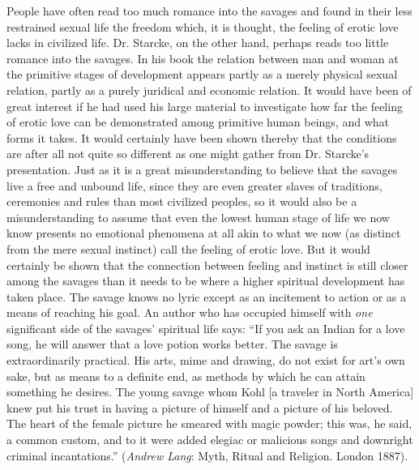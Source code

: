 \documentclass[12pt,a4paper,openany]{book}
\begin{document}
People have often read too much romance into the savages
and found in their less restrained sexual life the freedom which, it is
thought, the feeling of erotic love lacks in civilized life. Dr. Starcke,
on the other hand, perhaps reads too little romance into the savages.
In his book the relation between man and woman at
the primitive stages of development appears partly as a merely physical sexual relation,
partly as a purely juridical and economic relation. It would have
been of great interest if he had used his large material
to investigate how far the feeling of erotic love can be demonstrated among
primitive human beings, and what forms it takes. It would
certainly have been shown thereby that the conditions are after all not quite so
different as one might gather from Dr. Starcke's presentation.
Just as it is a great misunderstanding to believe that
the savages live a free and unbound life, since they are even greater
slaves of traditions, ceremonies and rules than most civilized
peoples, so it would also be a misunderstanding to
assume that even the lowest human stage of life we now know
presents no emotional phenomena at all akin to
what we now (as distinct from the mere sexual instinct) call the feeling of erotic love.
But it would certainly be shown that the connection between
feeling and instinct is still closer among the savages than it needs
to be where a higher spiritual development has taken place. The
savage knows no lyric except as an incitement to action or
as a means of reaching his goal. An author who has occupied himself
with \emph{one} significant side of the savages' spiritual life says:
``If you ask an Indian for a love song, he will answer
that a love potion works better. The savage is extraordinarily practical.
His arts, mime and drawing, do not exist for art's own
sake, but as means to a definite end, as methods by
which he can attain something he desires. The young savage whom
Kohl [a traveler in North America] knew put his trust in
having a picture of himself and a picture of his beloved. The
heart of the female picture he smeared with magic powder; this
was, he said, a common custom, and to it were added elegiac
or malicious songs and downright criminal incantations.''
(\emph{Andrew Lang}: Myth, Ritual and Religion. London 1887).
\end{document}
